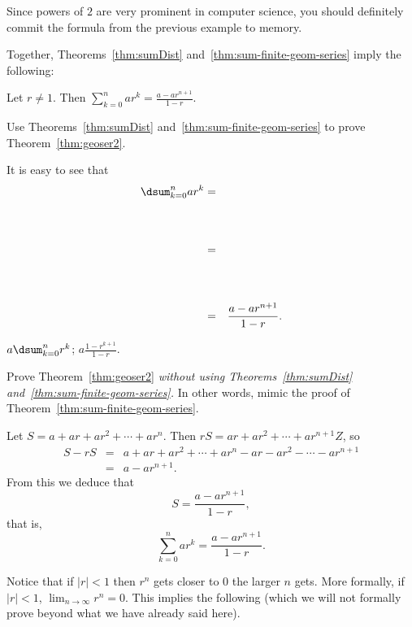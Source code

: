 Since powers of $2$ are very prominent in computer science,
you should definitely commit the formula from the previous example to memory.

Together, Theorems~\ref{thm:sumDist} and~\ref{thm:sum-finite-geom-series} imply the following:

\begin{thm}\label{thm:geoser2}
Let $r\neq 1$.  Then 
$\displaystyle\sum_{k=0}^{n}ar^k  =\frac{a-ar^{n+1}}{1-r}.$
\end{thm}
\newpage

\begin{fib}
Use  Theorems~\ref{thm:sumDist} and~\ref{thm:sum-finite-geom-series} to prove Theorem~\ref{thm:geoser2}.
\begin{pf}
It is easy to see that
\begin{eqnarray*}
\dsum_{k=0}^{n}ar^k &=&\\[.5in]
&=&\\[.5in]
&=&\frac{a-ar^{n+1}}{1-r}.
\end{eqnarray*}
\end{pf}
\begin{answer}
$a\dsum_{k=0}^{n}r^k$;
$a\frac{1-r^{k+1}}{1-r}$.
\end{answer}
\end{fib}

\begin{exer}
Prove Theorem~\ref{thm:geoser2} {\em without using  
Theorems~\ref{thm:sumDist} and~\ref{thm:sum-finite-geom-series}.}
In other words, mimic the proof of Theorem~\ref{thm:sum-finite-geom-series}.

\vspace*{3.5in}
\begin{answer}
Let $S = a + ar + ar^2 + \cdots + ar^{n}.$ 
Then $rS = ar + ar^2 + \cdots + ar^{n+1}Z$, so 
\begin{eqnarray*}
S - rS &=& a + ar + ar^2 + \cdots + ar^{n} - ar - ar^2 - \cdots - ar^{n+1}\\
&=& a - ar^{n+1}.
\end{eqnarray*}
From this we deduce that $$S = \frac{a - ar^{n+1}}{1 - r},$$
that is,
$$ \sum_{k=0}^{n}ar^k= \frac{a - ar^{n+1}}{1 - r}.$$
\end{answer}
\end{exer}


Notice that if $|r| < 1$ then $r^n$ gets closer to $0$ the larger $n$ gets.
More formally, if $|r|<1$,  ${\displaystyle \lim_{n\rightarrow \infty} r^n=0}$.
This implies the following (which we will not formally prove beyond what
we have already said here).


